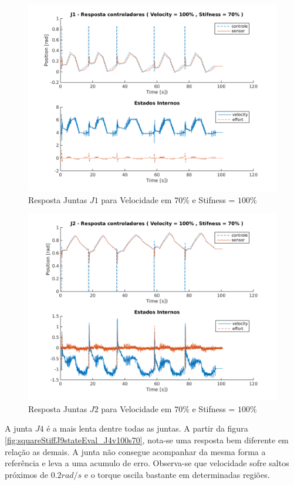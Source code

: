 \vspace{1cm}
\begin{figure}[H]
    \centering
    \includegraphics[width=0.6\linewidth,trim={2cm 1cm 2cm 2cm}]{tex/figs/squareStiffJ9stateEval_J1v100s70.png}
    \caption{Resposta Juntas $J1$ para Velocidade em $70\%$ e Stifness = $100\%$ }
    \label{fig:squareStiffJ9stateEval_J1v100s70}
\end{figure}

\vspace{1cm}

\begin{figure}[H]
    \centering
    \includegraphics[width=0.6\linewidth,trim={2cm 1cm 2cm 2cm}]{tex/figs/squareStiffJ9stateEval_J2v100s70.png}
    \caption{Resposta Juntas $J2$ para Velocidade em $70\%$ e Stifness = $100\%$ }
    \label{fig:squareStiffJ9stateEval_J2v100s70}
\end{figure}

A junta $J4$ é a mais lenta dentre todas as juntas. A partir da figura \ref{fig:squareStiffJ9stateEval_J4v100s70}, nota-se uma resposta bem diferente em relação as demais. A junta não consegue acompanhar da mesma forma a referência e leva a uma acumulo de erro. Observa-se que velocidade sofre saltos próximos de $0.2 rad/s$ e o torque oscila bastante em determinadas regiões.

\vspace{1cm}

